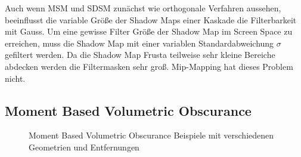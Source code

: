 \documentclass[runningheaders,a4paper]{llncs}
\begin{document}
Auch wenn MSM und SDSM zunächst wie orthogonale Verfahren aussehen, beeinflusst die variable Größe der Shadow Maps einer Kaskade die Filterbarkeit mit Gauss.
Um eine gewisse Filter Größe der Shadow Map im Screen Space zu erreichen, muss die Shadow Map mit einer variablen Standardabweichung $\sigma$ gefiltert werden.
Da die Shadow Map Frusta teilweise sehr kleine Bereiche abdecken werden die Filtermasken sehr groß.
Mip-Mapping hat dieses Problem nicht.


\subsection{Moment Based Volumetric Obscurance}
\begin{figure}[H]
	\centering
	
	\caption{Moment Based Volumetric Obscurance Beispiele mit verschiedenen Geometrien und Entfernungen}
\end{figure}
\end{document}

